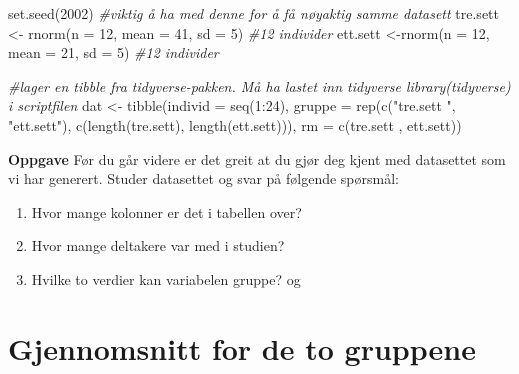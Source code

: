 \documentclass[
]{book}
\newenvironment{Shaded}{\begin{snugshade}}{\end{snugshade}}
\newcommand{\AttributeTok}[1]{\textcolor[rgb]{0.77,0.63,0.00}{#1}}
\newcommand{\CommentTok}[1]{\textcolor[rgb]{0.56,0.35,0.01}{\textit{#1}}}
\newcommand{\DecValTok}[1]{\textcolor[rgb]{0.00,0.00,0.81}{#1}}
\newcommand{\FunctionTok}[1]{\textcolor[rgb]{0.00,0.00,0.00}{#1}}
\newcommand{\NormalTok}[1]{#1}
\newcommand{\OtherTok}[1]{\textcolor[rgb]{0.56,0.35,0.01}{#1}}
\newcommand{\SpecialCharTok}[1]{\textcolor[rgb]{0.00,0.00,0.00}{#1}}
\newcommand{\StringTok}[1]{\textcolor[rgb]{0.31,0.60,0.02}{#1}}
\providecommand{\tightlist}{%
  \setlength{\itemsep}{0pt}\setlength{\parskip}{0pt}}
\begin{document}
\begin{Shaded}
\begin{Highlighting}[]
\FunctionTok{set.seed}\NormalTok{(}\DecValTok{2002}\NormalTok{) }\CommentTok{\#viktig å ha med denne for å få nøyaktig samme datasett}
\NormalTok{tre.sett }\OtherTok{\textless{}{-}} \FunctionTok{rnorm}\NormalTok{(}\AttributeTok{n =} \DecValTok{12}\NormalTok{, }\AttributeTok{mean =} \DecValTok{41}\NormalTok{, }\AttributeTok{sd =} \DecValTok{5}\NormalTok{) }\CommentTok{\#12 individer}
\NormalTok{ett.sett }\OtherTok{\textless{}{-}}\FunctionTok{rnorm}\NormalTok{(}\AttributeTok{n =} \DecValTok{12}\NormalTok{, }\AttributeTok{mean =} \DecValTok{21}\NormalTok{, }\AttributeTok{sd =} \DecValTok{5}\NormalTok{) }\CommentTok{\#12 individer}

\CommentTok{\#lager en tibble fra tidyverse{-}pakken. Må ha lastet inn tidyverse library(tidyverse) i scriptfilen}
\NormalTok{dat }\OtherTok{\textless{}{-}} \FunctionTok{tibble}\NormalTok{(}\AttributeTok{individ =} \FunctionTok{seq}\NormalTok{(}\DecValTok{1}\SpecialCharTok{:}\DecValTok{24}\NormalTok{),}
              \AttributeTok{gruppe =} \FunctionTok{rep}\NormalTok{(}\FunctionTok{c}\NormalTok{(}\StringTok{"tre.sett "}\NormalTok{, }\StringTok{"ett.sett"}\NormalTok{), }\FunctionTok{c}\NormalTok{(}\FunctionTok{length}\NormalTok{(tre.sett), }\FunctionTok{length}\NormalTok{(ett.sett))),}
              \AttributeTok{rm =} \FunctionTok{c}\NormalTok{(tre.sett , ett.sett))}
\end{Highlighting}
\end{Shaded}

\textbf{Oppgave}
Før du går videre er det greit at du gjør deg kjent med datasettet som vi har generert. Studer datasettet og svar på følgende spørsmål:

\begin{enumerate}
\def\labelenumi{\alph{enumi})}
\tightlist
\item
  Hvor mange kolonner er det i tabellen over?
\item
  Hvor mange deltakere var med i studien?
\item
  Hvilke to verdier kan variabelen gruppe? og
\end{enumerate}

\hypertarget{gjennomsnitt-for-de-to-gruppene}{%
\section{Gjennomsnitt for de to gruppene}\label{gjennomsnitt-for-de-to-gruppene}}
\end{document}

